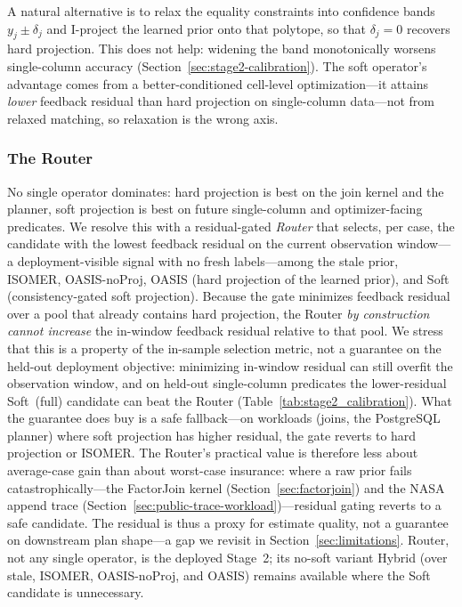 \documentclass[preprint,12pt]{elsarticle}
\begin{document}
A natural alternative is to relax the equality constraints into confidence bands
$y_j\pm\delta_j$ and I-project the learned prior onto that polytope, so that
$\delta_j=0$ recovers hard projection. This does not help: widening the band
monotonically worsens single-column accuracy
(Section~\ref{sec:stage2-calibration}). The soft operator's advantage comes from
a better-conditioned cell-level optimization---it attains \emph{lower} feedback
residual than hard projection on single-column data---not from relaxed matching,
so relaxation is the wrong axis.

\subsubsection{The Router}

No single operator dominates: hard projection is best on the join kernel and the
planner, soft projection is best on future single-column and optimizer-facing
predicates. We resolve this with a residual-gated \emph{Router} that
selects, per case, the candidate with the lowest feedback residual on the current
observation window---a deployment-visible signal with no fresh labels---among the
stale prior, ISOMER, OASIS-noProj, OASIS (hard projection of the learned prior),
and Soft (consistency-gated soft projection). Because the gate minimizes feedback
residual over a pool that already contains hard projection, the Router \emph{by
construction cannot increase} the in-window feedback residual relative to that
pool. We stress that this is a property of the in-sample selection metric, not a
guarantee on the held-out deployment objective: minimizing in-window residual can
still overfit the observation window, and on held-out single-column predicates the
lower-residual Soft~(full) candidate can beat the Router
(Table~\ref{tab:stage2_calibration}). What the guarantee does buy is a safe
fallback---on workloads (joins, the PostgreSQL planner) where soft projection has
higher residual, the gate reverts to hard projection or ISOMER. The Router's
practical value is therefore less about average-case gain than about worst-case
insurance: where a raw prior fails catastrophically---the FactorJoin kernel
(Section~\ref{sec:factorjoin}) and the NASA append trace
(Section~\ref{sec:public-trace-workload})---residual gating reverts to a safe
candidate. The residual is thus a proxy for estimate quality, not a guarantee on
downstream plan shape---a gap we revisit in Section~\ref{sec:limitations}. Router, not any single
operator, is the deployed Stage~2; its no-soft variant Hybrid (over stale, ISOMER,
OASIS-noProj, and OASIS) remains available where the Soft candidate is
unnecessary.
\end{document}
